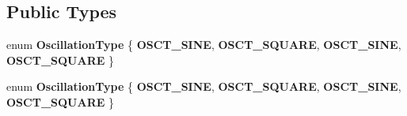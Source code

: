 \subsection*{Public Types}
\begin{DoxyCompactItemize}
\item 
\mbox{\label{classPUDynamicAttributeOscillate_af672b30d6bd96b17377ab243e1539765}} 
enum {\bfseries Oscillation\+Type} \{ {\bfseries O\+S\+C\+T\+\_\+\+S\+I\+NE}, 
{\bfseries O\+S\+C\+T\+\_\+\+S\+Q\+U\+A\+RE}, 
{\bfseries O\+S\+C\+T\+\_\+\+S\+I\+NE}, 
{\bfseries O\+S\+C\+T\+\_\+\+S\+Q\+U\+A\+RE}
 \}
\item 
\mbox{\label{classPUDynamicAttributeOscillate_af672b30d6bd96b17377ab243e1539765}} 
enum {\bfseries Oscillation\+Type} \{ {\bfseries O\+S\+C\+T\+\_\+\+S\+I\+NE}, 
{\bfseries O\+S\+C\+T\+\_\+\+S\+Q\+U\+A\+RE}, 
{\bfseries O\+S\+C\+T\+\_\+\+S\+I\+NE}, 
{\bfseries O\+S\+C\+T\+\_\+\+S\+Q\+U\+A\+RE}
 \}
\end{DoxyCompactItemize}
